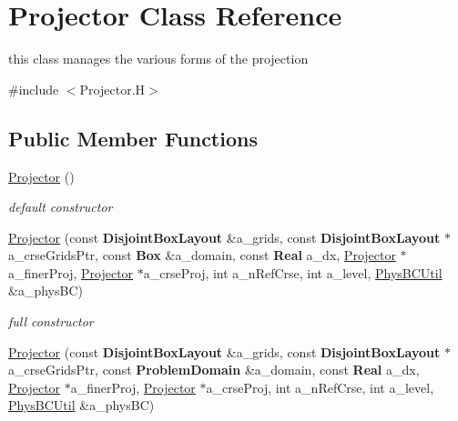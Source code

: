\hypertarget{class_projector}{}\section{Projector Class Reference}
\label{class_projector}


this class manages the various forms of the projection  




{\ttfamily \#include $<$Projector.\+H$>$}

\subsection*{Public Member Functions}
\begin{DoxyCompactItemize}
\item 
\mbox{\label{class_projector_ae63e4c28ef37e033c1d7eec1252461ef}} 
\hyperlink{class_projector_ae63e4c28ef37e033c1d7eec1252461ef}{Projector} ()
\begin{DoxyCompactList}\small\item\em default constructor \end{DoxyCompactList}\item 
\mbox{\label{class_projector_ae09d7fe04293bb74f2474083ecdd3ef4}} 
\hyperlink{class_projector_ae09d7fe04293bb74f2474083ecdd3ef4}{Projector} (const \textbf{ Disjoint\+Box\+Layout} \&a\+\_\+grids, const \textbf{ Disjoint\+Box\+Layout} $\ast$a\+\_\+crse\+Grids\+Ptr, const \textbf{ Box} \&a\+\_\+domain, const \textbf{ Real} a\+\_\+dx, \hyperlink{class_projector}{Projector} $\ast$a\+\_\+finer\+Proj, \hyperlink{class_projector}{Projector} $\ast$a\+\_\+crse\+Proj, int a\+\_\+n\+Ref\+Crse, int a\+\_\+level, \hyperlink{class_phys_b_c_util}{Phys\+B\+C\+Util} \&a\+\_\+phys\+BC)
\begin{DoxyCompactList}\small\item\em full constructor \end{DoxyCompactList}\item 
\mbox{\label{class_projector_a8bae1546100678aeb49649aee7be825f}} 
\hyperlink{class_projector_a8bae1546100678aeb49649aee7be825f}{Projector} (const \textbf{ Disjoint\+Box\+Layout} \&a\+\_\+grids, const \textbf{ Disjoint\+Box\+Layout} $\ast$a\+\_\+crse\+Grids\+Ptr, const \textbf{ Problem\+Domain} \&a\+\_\+domain, const \textbf{ Real} a\+\_\+dx, \hyperlink{class_projector}{Projector} $\ast$a\+\_\+finer\+Proj, \hyperlink{class_projector}{Projector} $\ast$a\+\_\+crse\+Proj, int a\+\_\+n\+Ref\+Crse, int a\+\_\+level, \hyperlink{class_phys_b_c_util}{Phys\+B\+C\+Util} \&a\+\_\+phys\+BC)

\end{DoxyCompactItemize}

